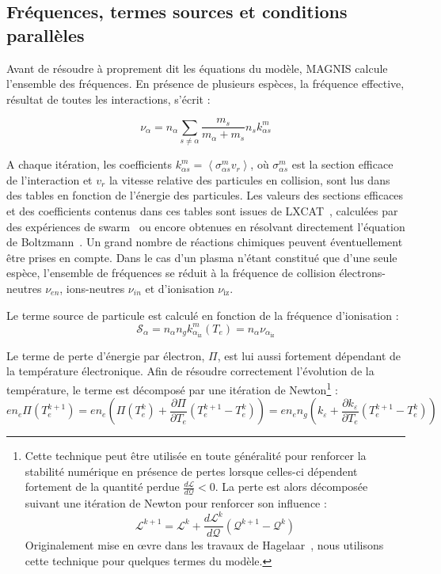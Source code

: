 \begin{refsection}
\subsection{Fréquences, termes sources et conditions parallèles}
Avant de résoudre à proprement dit les équations du modèle, MAGNIS
calcule l'ensemble des fréquences. En présence de plusieurs espèces, la
fréquence effective, résultat de toutes les interactions, s'écrit :

\begin{equation*}
\nu_{\alpha}=n_\alpha\sum_{s\neq\alpha} \frac{m_s}{m_\alpha+m_s}
n_sk^m_{\alpha s}
\end{equation*}

A chaque itération, les coefficients $k^m_{\alpha s}=\left<\sigma^m_{\alpha
s}v_r\right>$, où $\sigma^m_{\alpha
s}$ est la section efficace de l'interaction et $v_r$ la vitesse relative des
particules en collision, sont lus dans des tables en fonction de l'énergie des
particules.
Les valeurs des sections efficaces et des coefficients contenus dans ces tables
sont issues de LXCAT~\parencite{LXCAT}, calculées par des expériences de
swarm~\parencite{Phelps} ou encore obtenues en résolvant directement l'équation
de Boltzmann~\parencite{Bolsig}. Un grand
nombre de réactions chimiques peuvent éventuellement être prises en compte.
Dans le cas d'un plasma n'étant constitué que d'une seule espèce, l'ensemble
de fréquences se réduit à la fréquence de collision électrons-neutres
$\nu_{en}$, ions-neutres $\nu_{in}$ et d'ionisation $\nu_\text{iz}$.

Le terme source de particule est calculé en fonction de la fréquence
d'ionisation :
\begin{equation*}
\mathcal{S}_{\alpha}=n_\alpha n_g
k^m_{\alpha_\text{iz}}(T_e)=n_\alpha\nu_{\alpha_\text{iz}}
\end{equation*}

Le terme de perte d'énergie par électron, $\Pi$, est lui aussi fortement
dépendant de la température électronique. Afin de résoudre correctement
l'évolution de la température, le terme est décomposé par une itération
de Newton\footnote{Cette technique peut être utilisée en toute généralité pour
renforcer la stabilité numérique en présence de pertes lorsque celles-ci
dépendent fortement de la quantité perdue 
$\frac{d\mathcal L}{d\mathcal Q}<0$.
La perte est alors décomposée suivant une itération de Newton pour renforcer son
influence :
\begin{equation*}
\mathcal L^{k+1}=\mathcal L^{k}+\frac{d\mathcal L^{k}}{d\mathcal Q}(\mathcal
Q^{k+1}-\mathcal Q^k) \end{equation*}
Originalement mise en \oe vre dans les travaux de
Hagelaar~\parencite{HagelaarImpl}, nous utilisons cette technique pour quelques
termes du modèle.} :
\begin{equation*}
en_e\Pi(T_e^{k+1})=en_e\left(\Pi(T_e^{k})+\frac{\partial\Pi}{\partial
T_e}\left(T_e^{k+1}-T_e^{k}\right)\right)= en_en_g\left(k_{\varepsilon}+
\frac{\partial k_{\varepsilon}}{\partial T_e}(T_e^{k+1}-T_e^{k})\right)
\end{equation*}


\end{refsection}
